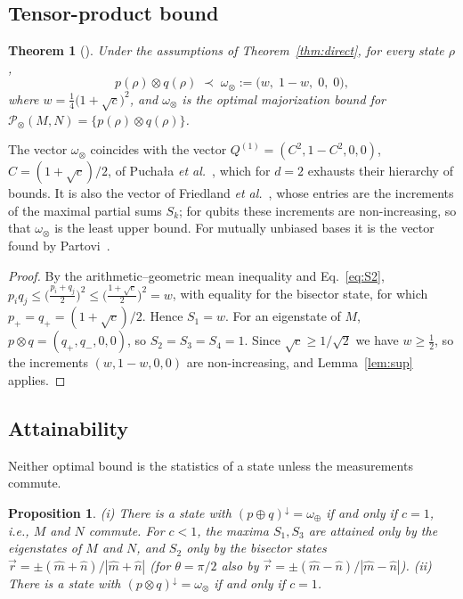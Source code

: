 \documentclass[aps,pra,twocolumn,superscriptaddress,nofootinbib,floatfix]{revtex4-2}
\newtheorem{theorem}{Theorem}
\newtheorem{proposition}{Proposition}
\theoremstyle{definition}
\newcommand{\vecr}{\vec r}
\newcommand{\mhat}{\hat m}
\newcommand{\nhat}{\hat n}
\newcommand{\maj}{\prec}
\newcommand{\omplus}{\omega_{\oplus}}
\newcommand{\omtimes}{\omega_{\otimes}}
\newcommand{\sqc}{\sqrt{c}}
\newcommand{\Ach}{\mathcal{P}}
\begin{document}
\subsection{Tensor-product bound}

\begin{theorem}[\cite{FGG2013,PRZ2013,Partovi2011}]
\label{thm:tensor}
Under the assumptions of Theorem~\ref{thm:direct}, for every state $\rho$,
\begin{equation}
  p(\rho)\otimes q(\rho)\;\maj\;\omtimes:=\bigl(w,\;1-w,\;0,\;0\bigr),
  \label{eq:omtimes}
\end{equation}
where $w=\frac14\bigl(1+\sqc\bigr)^2$, and $\omtimes$ is the optimal
majorization bound for $\Ach_\otimes(M,N)=\{p(\rho)\otimes q(\rho)\}$.
\end{theorem}

The vector $\omtimes$ coincides with the vector $Q^{(1)}=(C^2,1-C^2,0,0)$,
$C=(1+\sqc)/2$, of Pucha{\l}a \emph{et al.}~\cite{PRZ2013}, which for $d=2$
exhausts their hierarchy of bounds. It is also the vector of Friedland
\emph{et al.}~\cite{FGG2013}, whose entries are the increments of the maximal
partial sums $S_k$; for qubits these increments are non-increasing, so that
$\omtimes$ is the least upper bound. For mutually unbiased bases it is the
vector found by Partovi~\cite{Partovi2011}.

\begin{proof}
By the arithmetic--geometric mean inequality and Eq.~\eqref{eq:S2},
$p_iq_j\le\bigl(\tfrac{p_i+q_j}{2}\bigr)^2\le\bigl(\tfrac{1+\sqc}{2}\bigr)^2=w$,
with equality for the bisector state, for which $p_+=q_+=(1+\sqc)/2$.
Hence $S_1=w$. For an eigenstate of $M$, $p\otimes q=(q_+,q_-,0,0)$, so
$S_2=S_3=S_4=1$. Since $\sqc\ge1/\sqrt2$ we have $w\ge\frac12$, so the increments
$(w,1-w,0,0)$ are non-increasing, and Lemma~\ref{lem:sup} applies.
\end{proof}

\subsection{Attainability}

Neither optimal bound is the statistics of a state unless the measurements
commute.

\begin{proposition}
\label{prop:attain}
(i) There is a state with $(p\oplus q)^\downarrow=\omplus$ if and only if $c=1$,
i.e., $M$ and $N$ commute. For $c<1$, the maxima $S_1,S_3$ are attained only by
the eigenstates of $M$ and $N$, and $S_2$ only by the bisector states
$\vecr=\pm(\mhat+\nhat)/|\mhat+\nhat|$ (for $\theta=\pi/2$ also by
$\vecr=\pm(\mhat-\nhat)/|\mhat-\nhat|$).
(ii) There is a state with $(p\otimes q)^\downarrow=\omtimes$ if and only if
$c=1$.
\end{proposition}
\end{document}
